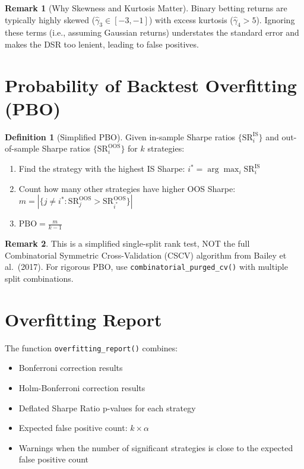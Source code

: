 \documentclass[12pt,a4paper]{report}
\theoremstyle{definition}
\newtheorem{definition}{Definition}[chapter]
\newtheorem{remark}{Remark}[chapter]
\newcommand{\func}[1]{\texttt{#1()}}
\begin{document}
\begin{remark}[Why Skewness and Kurtosis Matter]
Binary betting returns are typically highly skewed ($\hat{\gamma}_3 \in [-3, -1]$) with excess kurtosis ($\hat{\gamma}_4 > 5$). Ignoring these terms (i.e., assuming Gaussian returns) understates the standard error and makes the DSR too lenient, leading to false positives.
\end{remark}

\section{Probability of Backtest Overfitting (PBO)}
\label{sec:pbo}

\begin{definition}[Simplified PBO]
Given in-sample Sharpe ratios $\{\text{SR}_i^{\text{IS}}\}$ and out-of-sample Sharpe ratios $\{\text{SR}_i^{\text{OOS}}\}$ for $k$ strategies:

\begin{enumerate}
    \item Find the strategy with the highest IS Sharpe: $i^* = \arg\max_i \text{SR}_i^{\text{IS}}$
    \item Count how many other strategies have higher OOS Sharpe: $m = |\{j \neq i^* : \text{SR}_j^{\text{OOS}} > \text{SR}_{i^*}^{\text{OOS}}\}|$
    \item $\text{PBO} = \frac{m}{k - 1}$
\end{enumerate}
\end{definition}

\begin{remark}
This is a simplified single-split rank test, NOT the full Combinatorial Symmetric Cross-Validation (CSCV) algorithm from Bailey et al.\ (2017). For rigorous PBO, use \func{combinatorial\_purged\_cv} with multiple split combinations.
\end{remark}

\section{Overfitting Report}

The function \func{overfitting\_report} combines:
\begin{itemize}
    \item Bonferroni correction results
    \item Holm-Bonferroni correction results
    \item Deflated Sharpe Ratio p-values for each strategy
    \item Expected false positive count: $k \times \alpha$
    \item Warnings when the number of significant strategies is close to the expected false positive count
\end{itemize}
\end{document}
